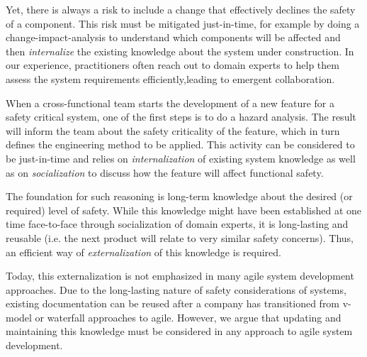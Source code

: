 Yet, there is always a risk to include a change %
that effectively declines the safety of a component.
This risk must be mitigated just-in-time, for example by doing a change-impact-analysis to understand which components will be affected and then \emph{internalize} the existing knowledge about the system under construction.
In our experience, practitioners often reach out to domain experts to help them assess the system requirements efficiently,leading to emergent collaboration.

When a cross-functional team starts the development of a new feature for a safety critical system, one of the first steps is to do a hazard analysis. 
The result will inform the team about the safety criticality of the feature, which in turn defines the engineering method to be applied. 
This activity can be considered to be just-in-time and relies on \emph{internalization} of existing system knowledge as well as on \emph{socialization} to discuss how the feature will affect functional safety.%

The foundation for such reasoning is long-term knowledge about the desired (or required) level of safety. 
While this knowledge might have been established at one time face-to-face through socialization of domain experts, it is long-lasting and reusable (i.e. the next product will relate to very similar safety concerns). 
Thus, an efficient way of \emph{externalization} of this knowledge is required. 

Today, this externalization is not emphasized in many agile system development approaches.
Due to the long-lasting nature of safety considerations of systems, existing documentation can be reused after a company has transitioned from v-model or waterfall approaches to agile. 
However, we argue that updating and maintaining this knowledge must be considered in any approach to agile system development.